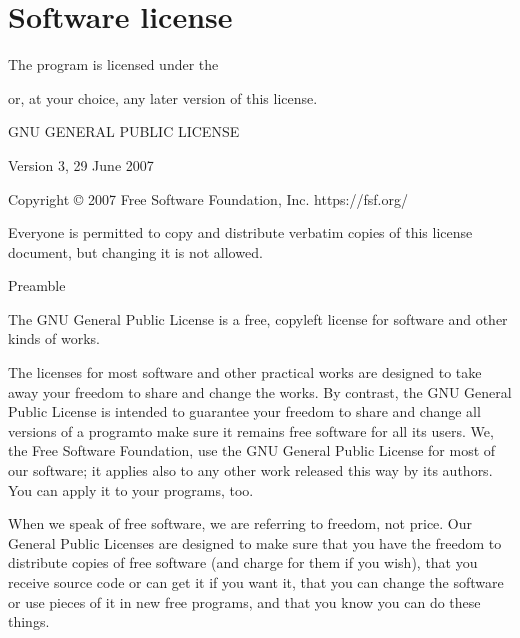\documentclass[letterpaper,10pt,english]{sphinxmanual}
\begin{document}
\chapter{Software license}
\label{\detokenize{04-appendix/license_enroute:software-license}}\label{\detokenize{04-appendix/license_enroute::doc}}
\sphinxAtStartPar
The program  is licensed under the %
\begin{footnote}[20]\sphinxAtStartFootnote
{}
%
\end{footnote} or,
at your choice, any later version of this license.

\begin{sphinxVerbatim}[commandchars=\\\{\}]
 GNU GENERAL PUBLIC LICENSE

 Version 3, 29 June 2007

 Copyright © 2007 Free Software Foundation, Inc. \PYGZlt{}https://fsf.org/\PYGZgt{}

 Everyone is permitted to copy and distribute verbatim copies of this license
 document, but changing it is not allowed.

 Preamble

   The GNU General Public License is a free, copyleft license for software and
   other kinds of works.

   The licenses for most software and other practical works are designed to
   take away your freedom to share and change the works. By contrast, the GNU
   General Public License is intended to guarantee your freedom to share and
   change all versions of a program\PYGZhy{}\PYGZhy{}to make sure it remains free software for
   all its users. We, the Free Software Foundation, use the GNU General Public
   License for most of our software; it applies also to any other work released
   this way by its authors. You can apply it to your programs, too.

   When we speak of free software, we are referring to freedom, not price. Our
   General Public Licenses are designed to make sure that you have the freedom
   to distribute copies of free software (and charge for them if you wish),
   that you receive source code or can get it if you want it, that you can
   change the software or use pieces of it in new free programs, and that you
   know you can do these things.


\end{sphinxVerbatim}
\end{document}
